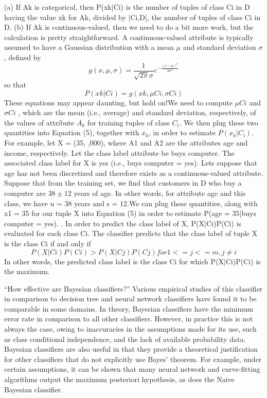 \documentclass[journal]{IEEEtran}
\begin{document}
(a) If Ak is categorical, then P(xk|Ci) is the number of tuples of class Ci in D having the value xk for Ak, divided by |Ci,D|, the number of tuples of class Ci in D.
(b) If Ak is continuous-valued, then we need to do a bit more work, but the calculation is pretty straightforward. A continuous-valued attribute is typically assumed to have a Gaussian distribution with a mean $\mu$ and standard deviation $\sigma$, defined by
\begin{equation}g(x, \mu, \sigma) = \frac{1}{\sqrt{2\pi}\sigma}e^{-\frac{(x-\mu)^2}{2\sigma^2}} \end{equation}
so that
\begin{equation}P(xk|Ci) = g(xk, \mu Ci , \sigma Ci )\end{equation}
These equations may appear daunting, but hold on!We need to compute $ \mu Ci $ and $\sigma Ci$ , which are the mean (i.e., average) and standard deviation, respectively, of the values of attribute $ A_{k} $ for training tuples of class $ C_{i} $. We then plug these two quantities into Equation (5), together with $ x_{k} $, in order to estimate $P(x_{k}|C_{i})$.
For example, let X = (35, ,000), where A1 and A2 are the attributes age and income, respectively. Let the class label attribute be buys computer. The associated class label for X is yes (i.e., buys computer = yes). Lets suppose that age has not been discretized and therefore exists as a continuous-valued attribute. Suppose that from the training set, we find that customers in D who buy a computer are $38\pm12$ years of age. In other words, for attribute age and this class, we have u = 38 years and s = 12.We can plug these quantities, along with x1 = 35 for our tuple X into Equation (5) in order to estimate P(age = 35|buys computer = yes).
. In order to predict the class label of X, P(X|Ci)P(Ci) is evaluated for each class Ci. The classifier predicts that the class label of tuple X is the class Ci if and only if
\begin{equation}P(X|Ci)P(Ci) > P(X|Cj)P(Cj) for 1 <= j <= m, j \neq i \end{equation}
In other words, the predicted class label is the class Ci for which P(X|Ci)P(Ci) is the
maximum.

``How effective are Bayesian classifiers?'' Various empirical studies of this classifier in comparison to decision tree and neural network classifiers have found it to be comparable in some domains. In theory, Bayesian classifiers have the minimum error rate in comparison to all other classifiers. However, in practice this is not always the case, owing to inaccuracies in the assumptions made for its use, such as class conditional independence, and the lack of available probability data.
Bayesian classifiers are also useful in that they provide a theoretical justification for other classifiers that do not explicitly use Bayes' theorem. For example, under certain assumptions, it can be shown that many neural network and curve-fitting algorithms output the maximum posteriori hypothesis, as does the Naive Bayesian classifier.
\end{document}
